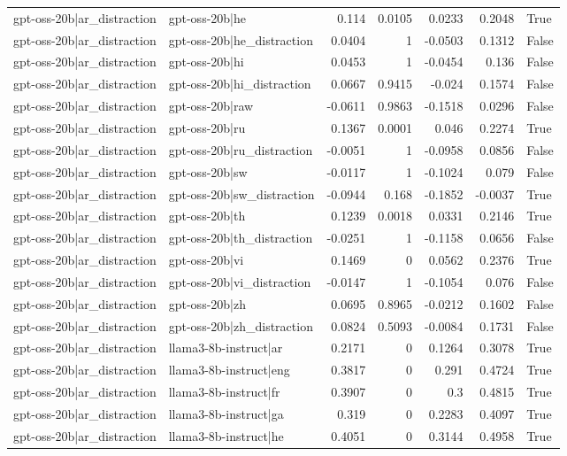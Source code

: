 \begin{table}
\begin{tabular}{l l r r r r l}
gpt-oss-20b|ar_distraction & gpt-oss-20b|he & 0.114 & 0.0105 & 0.0233 & 0.2048 & True \\
gpt-oss-20b|ar_distraction & gpt-oss-20b|he_distraction & 0.0404 & 1 & -0.0503 & 0.1312 & False \\
gpt-oss-20b|ar_distraction & gpt-oss-20b|hi & 0.0453 & 1 & -0.0454 & 0.136 & False \\
gpt-oss-20b|ar_distraction & gpt-oss-20b|hi_distraction & 0.0667 & 0.9415 & -0.024 & 0.1574 & False \\
gpt-oss-20b|ar_distraction & gpt-oss-20b|raw & -0.0611 & 0.9863 & -0.1518 & 0.0296 & False \\
gpt-oss-20b|ar_distraction & gpt-oss-20b|ru & 0.1367 & 0.0001 & 0.046 & 0.2274 & True \\
gpt-oss-20b|ar_distraction & gpt-oss-20b|ru_distraction & -0.0051 & 1 & -0.0958 & 0.0856 & False \\
gpt-oss-20b|ar_distraction & gpt-oss-20b|sw & -0.0117 & 1 & -0.1024 & 0.079 & False \\
gpt-oss-20b|ar_distraction & gpt-oss-20b|sw_distraction & -0.0944 & 0.168 & -0.1852 & -0.0037 & True \\
gpt-oss-20b|ar_distraction & gpt-oss-20b|th & 0.1239 & 0.0018 & 0.0331 & 0.2146 & True \\
gpt-oss-20b|ar_distraction & gpt-oss-20b|th_distraction & -0.0251 & 1 & -0.1158 & 0.0656 & False \\
gpt-oss-20b|ar_distraction & gpt-oss-20b|vi & 0.1469 & 0 & 0.0562 & 0.2376 & True \\
gpt-oss-20b|ar_distraction & gpt-oss-20b|vi_distraction & -0.0147 & 1 & -0.1054 & 0.076 & False \\
gpt-oss-20b|ar_distraction & gpt-oss-20b|zh & 0.0695 & 0.8965 & -0.0212 & 0.1602 & False \\
gpt-oss-20b|ar_distraction & gpt-oss-20b|zh_distraction & 0.0824 & 0.5093 & -0.0084 & 0.1731 & False \\
gpt-oss-20b|ar_distraction & llama3-8b-instruct|ar & 0.2171 & 0 & 0.1264 & 0.3078 & True \\
gpt-oss-20b|ar_distraction & llama3-8b-instruct|eng & 0.3817 & 0 & 0.291 & 0.4724 & True \\
gpt-oss-20b|ar_distraction & llama3-8b-instruct|fr & 0.3907 & 0 & 0.3 & 0.4815 & True \\
gpt-oss-20b|ar_distraction & llama3-8b-instruct|ga & 0.319 & 0 & 0.2283 & 0.4097 & True \\
gpt-oss-20b|ar_distraction & llama3-8b-instruct|he & 0.4051 & 0 & 0.3144 & 0.4958 & True \\

\end{tabular}
\end{table}
